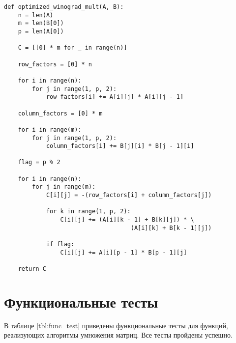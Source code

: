 \begin{center}
\captionsetup{justification=raggedright,singlelinecheck=off}
\begin{lstlisting}[label=lst:optimized,caption=Оптимизированный алгоритм Винограда умножения матриц]
def optimized_winograd_mult(A, B):
    n = len(A)
    m = len(B[0])
    p = len(A[0])

    C = [[0] * m for _ in range(n)]

    row_factors = [0] * n

    for i in range(n):
        for j in range(1, p, 2):
            row_factors[i] += A[i][j] * A[i][j - 1]

    column_factors = [0] * m

    for i in range(m):
        for j in range(1, p, 2):
            column_factors[i] += B[j][i] * B[j - 1][i]

    flag = p % 2

    for i in range(n):
        for j in range(m):
            C[i][j] = -(row_factors[i] + column_factors[j])

            for k in range(1, p, 2):
                C[i][j] += (A[i][k - 1] + B[k][j]) * \
                                    (A[i][k] + B[k - 1][j])
    
            if flag:
                C[i][j] += A[i][p - 1] * B[p - 1][j]
    
    return C
\end{lstlisting}
\end{center}

\section{Функциональные тесты}

В таблице \ref{tbl:func_test} приведены функциональные тесты для функций, реализующих алгоритмы умножения матриц. Все тесты пройдены успешно.

